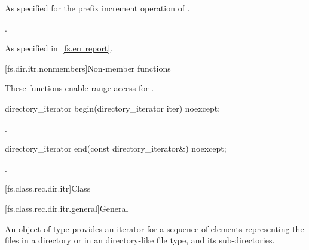 \begin{itemdescr}
\pnum
\effects
As specified for the prefix increment operation of
.

\pnum
\returns
{}.

\pnum
\throws
As specified in~\ref{fs.err.report}.
\end{itemdescr}

[fs.dir.itr.nonmembers]{Non-member functions}

\pnum
These functions enable range access for .

%
\begin{itemdecl}
directory_iterator begin(directory_iterator iter) noexcept;
\end{itemdecl}

\begin{itemdescr}
\pnum
\returns
{}.
\end{itemdescr}

%
\begin{itemdecl}
directory_iterator end(const directory_iterator&) noexcept;
\end{itemdecl}

\begin{itemdescr}
\pnum
\returns
{}.
\end{itemdescr}

[fs.class.rec.dir.itr]{Class }

[fs.class.rec.dir.itr.general]{General}

%
\pnum
An object of type  provides an iterator for
a sequence of  elements representing the files in a
directory or in an  directory-like file
type, and its sub-directories.

